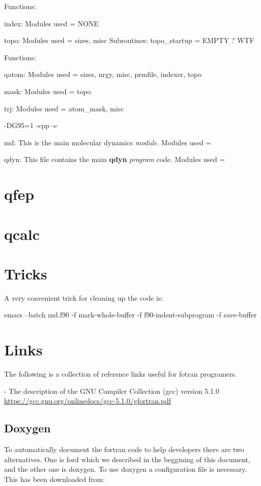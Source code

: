\documentclass[10pt, oneside, pdftex]{article}
\begin{document}
Functions:


index:
Modules used = NONE


topo:
Modules used = sizes, misc
Subroutines:
  topo\_startup = EMPTY ? WTF


Functions:


qatom:
Modules used = sizes, nrgy, misc, prmfile, indexer, topo


mask:
Modules used = topo


trj:
Modules used = atom\_mask, misc




-DG95=1 -cpp -c

md: This is the main molecular dynamics \textit{module}.
Modules used =


qdyn: This file contains the main \textbf{qdyn} \textit{program} code.
Modules used =



\section{qfep}
\label{qfep}


\section{qcalc}
\label{qcalc}


\section{Tricks}
\label{tricks}

A very convenient trick for cleaning up the code is:

emacs --batch md.f90 -f mark-whole-buffer -f f90-indent-subprogram -f save-buffer


\section{Links}
\label{links}
The following  is a  collection of reference  links useful  for fotran
programers.


\noindent - The description of the GNU Compiler Collection (gcc) version 5.1.0\\
\url{https://gcc.gnu.org/onlinedocs/gcc-5.1.0/gfortran.pdf}


\subsection{Doxygen}
\label{doxygen}
To automatically  document the fortran  code to help  developers there
are two alternatives. One is ford  which we described in the beggining
of this  document, and  the other  one is doxygen.   To use  doxygen a
configuration file is necessary.  This has been downloaded from:\\
\end{document}

